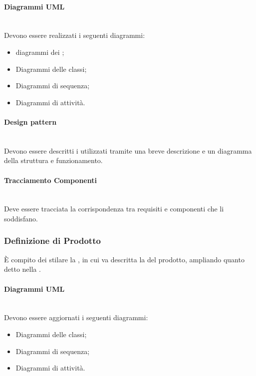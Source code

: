 \paragraph{Diagrammi UML}\mbox{}\\
Devono essere realizzati i seguenti diagrammi:
\begin{itemize}
\item diagrammi dei ;
\item Diagrammi delle classi;
\item Diagrammi di sequenza;
\item Diagrammi di attività.
\end{itemize}

\paragraph{Design pattern}\mbox{}\\
Devono essere descritti i  utilizzati tramite una breve descrizione e un diagramma della struttura e funzionamento.

\paragraph{Tracciamento Componenti}\mbox{}\\
Deve essere tracciata la corrispondenza tra requisiti e componenti che li soddisfano.

\subsubsection{Definizione di Prodotto}
\`{E} compito dei \Progettisti{} stilare la \DefinizioneDiProdotto, in cui va descritta la \PD{} del prodotto, ampliando quanto detto nella \SpecificaTecnica.

\paragraph{Diagrammi UML}\mbox{}\\
Devono essere aggiornati i seguenti diagrammi:
\begin{itemize}
\item Diagrammi delle classi;
\item Diagrammi di sequenza;
\item Diagrammi di attività.
\end{itemize}

